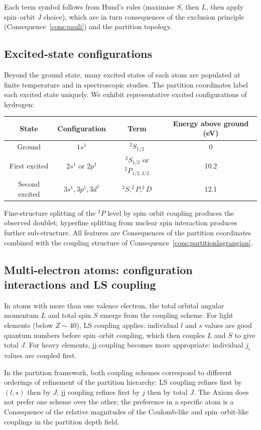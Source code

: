 Each term symbol follows from Hund's rules (maximise $S$, then $L$, then apply spin--orbit $J$ choice), which are in turn consequences of the exclusion principle (Consequence~\ref{cons:pauli}) and the partition topology.

\subsection{Excited-state configurations}

Beyond the ground state, many excited states of each atom are populated at finite temperature and in spectroscopic studies. The partition coordinates label each excited state uniquely. We exhibit representative excited configurations of hydrogen:
\begin{center}
\begin{tabular}{c|c|c|c}
\toprule
State & Configuration & Term & Energy above ground (eV)\\
\midrule
Ground & $1s^{1}$ & $^{2}S_{1/2}$ & 0 \\
First excited & $2s^{1}$ or $2p^{1}$ & $^{2}S_{1/2}$ or $^{2}P_{1/2,3/2}$ & 10.2 \\
Second excited & $3s^{1},3p^{1},3d^{1}$ & $^{2}S,^{2}P,^{2}D$ & 12.1 \\
\bottomrule
\end{tabular}
\end{center}
Fine-structure splitting of the $^{2}P$ level by spin--orbit coupling produces the observed doublet; hyperfine splitting from nuclear spin interaction produces further sub-structure. All features are Consequences of the partition coordinates combined with the coupling structure of Consequence~\ref{cons:partitionlagrangian}.

\subsection{Multi-electron atoms: configuration interactions and LS coupling}

In atoms with more than one valence electron, the total orbital angular momentum $L$ and total spin $S$ emerge from the coupling scheme. For light elements (below $Z\sim 40$), LS coupling applies: individual $l$ and $s$ values are good quantum numbers before spin--orbit coupling, which then couples $L$ and $S$ to give total $J$. For heavy elements, jj coupling becomes more appropriate: individual $j_{i}$ values are coupled first.

In the partition framework, both coupling schemes correspond to different orderings of refinement of the partition hierarchy: LS coupling refines first by $(l,s)$ then by $J$; jj coupling refines first by $j$ then by total $J$. The Axiom does not prefer one scheme over the other; the preference in a specific atom is a Consequence of the relative magnitudes of the Coulomb-like and spin--orbit-like couplings in the partition depth field.

